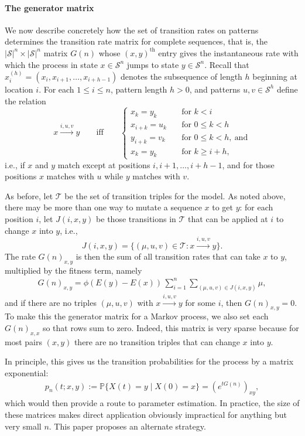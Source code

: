 \documentclass{article}
\renewcommand{\P}{\mathbb{P}}
\newcommand{\calS}{\mathcal{S}}  %
\newcommand{\calT}{\mathcal{T}}  %
\newcommand{\st}{\colon}  %
\theoremstyle{plain}
\theoremstyle{definition}
\begin{document}
\paragraph{The generator matrix}
We now describe concretely how the set of transition rates on patterns determines the transition rate matrix for complete sequences, that is,
the $|\calS|^n \times |\calS|^n$ matrix $G(n)$ whose $(x,y)^\text{th}$ entry gives the instantaneous rate
with which the process in state $x \in \calS^n$ jumps to state $y \in \calS^n$.
Recall that $x_i^{(h)} = (x_i, x_{i+1}, \ldots, x_{i+h-1})$ denotes the subsequence of length $h$ beginning at location $i$.
For each $1\le i \le n$, pattern length $h > 0$, and patterns $u,v \in \calS^h$ define the relation
\[
x \xrightarrow{i,u,v} y \qquad \text{iff} \qquad \begin{cases}
  x_k = y_k \quad &\text{for } k<i \\
  x_{i+k} = u_k \quad &\text{for } 0 \le k < h \\
  y_{i+k} = v_k \quad &\text{for } 0 \le k < h,\ \text{and} \\
  x_k = y_k \quad &\text{for } k\ge i+h ,
\end{cases}
\]
i.e., if $x$ and $y$ match except at positions $i,i+1,\ldots,i+h-1$,
and for those positions $x$ matches with $u$ while $y$ matches with $v$.

As before, let $\calT$ be the set of transition triples for the model.
As noted above, there may be more than one way to mutate a sequence $x$ to get $y$:
for each position $i$, let $J(i,x,y)$ be those transitions in $\calT$ that can be applied at $i$
to change $x$ into $y$, i.e.,
\[
    J(i,x,y) = \{ (\mu,u,v) \in \calT \st x \xrightarrow{i,u,v} y \}.
\]
The rate ${G(n)}_{x,y}$ is then the sum of all transition rates that can take $x$ to $y$,
multiplied by the fitness term,
namely
\begin{align} \label{eqn:G_defn}
    {G(n)}_{x,y} = \phi\left(E(y)-E(x)\right) \, \sum_{i=1}^n \sum_{(\mu, u, v) \in J(i,x,y)}  \mu ,
\end{align}
and if there are no triples $(\mu,u,v)$ with $x \xrightarrow{i,u,v} y$ for some $i$, then ${G(n)}_{x,y}=0$.
To make this the generator matrix for a Markov process,
we also set each $G(n)_{x,x}$ so that rows sum to zero.
Indeed, this matrix is very sparse because for most pairs $(x,y)$ there are no transition triples that can change $x$ into $y$.

In principle, this gives us the transition probabilities for the process by a matrix exponential:
\begin{align} \label{eqn:full_likelihood}
    p_n(t;x,y) := \P\{ X(t) = y \mid X(0) = x \} = {\left(e^{tG(n)}\right)}_{xy} ,
\end{align}
which would then provide a route to parameter estimation.
In practice, the size of these matrices makes direct application obviously impractical for anything but very small $n$.
This paper proposes an alternate strategy.
\end{document}
